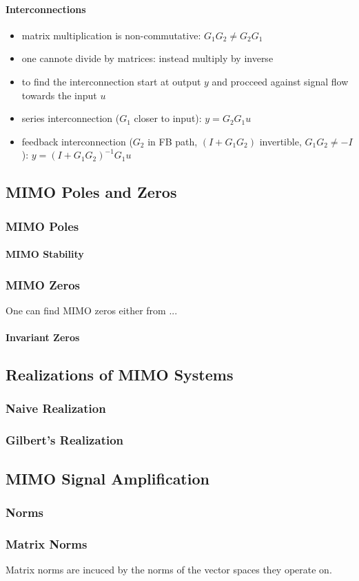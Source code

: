 \paragraph{Interconnections}

\begin{itemize}
    \item matrix multiplication is non-commutative: $G_1G_2 \ne G_2G_1$
    \item one cannote divide by matrices: instead multiply by inverse
    \item to find the interconnection start at output $y$ and procceed against signal flow towards the input $u$
    \item series interconnection ($G_1$ closer to input): $y=G_2G_1u$
    \item feedback interconnection ($G_2$ in FB path, $(I+G_1G_2)$ invertible, $G_1G_2\ne -I$): $y={(I+G_1G_2)}^{-1}G_1u$
\end{itemize}
\subsection{MIMO Poles and Zeros}
\subsubsection{MIMO Poles}
\paragraph{MIMO Stability}

\subsubsection{MIMO Zeros}
One can find MIMO zeros either from ...
\paragraph{Invariant Zeros}

\subsection{Realizations of MIMO Systems}
\subsubsection{Naive Realization}
\subsubsection{Gilbert's Realization}


\subsection{MIMO Signal Amplification}
\subsubsection{Norms}



\subsubsection{Matrix Norms}
Matrix norms are incuced by the norms of the vector spaces they operate on.




